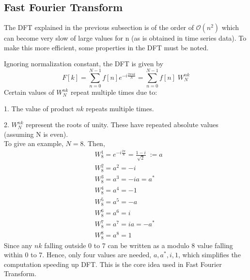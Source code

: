 \documentclass[11pt]{article}
\begin{document}
         \subsection{Fast Fourier Transform}
            The DFT explained in the previous subsection is of the order of $\mathcal{O}(n^2)$ which can become very slow of large values for n (as is obtained in time series data). To make this more efficient, some properties in the DFT must be noted.

            Ignoring normalization constant, the DFT is given by 
            $$
               F[k] = \sum_{n=0}^{N-1} f[n] e^{-i\frac{ 2\pi n k }{N}} = \sum_{n=0}^{N-1} f[n] \; W_N^{nk}
            $$
            Certain values of $W_N^{nk}$ repeat multiple times due to:

            1. The value of product $nk$ repeats multiple times.

            2. $W_N^{nk}$ represent the roots of unity. These have repeated absolute values (assuming N is even). \\[5mm]
            To give an example, $N=8$. Then,
            \begin{align*}
              & W_8^1 = e^{-i\frac{2\pi}{8}} = \frac{1 - i}{\sqrt{2}} \; := a \\
               &W_8^2 = a^2 = -i \\
               &W_8^3 = a^3 = -i a = a^* \\
               &W_8^4 = a^4 = -1 \\
               &W_8^5 = a^5 = -a \\
               &W_8^6 = a^6 = i \\
               &W_8^7 = a^7 = i a = -a^* \\
               &W_8^8 = a^8 = 1
            \end{align*}
            Since any $nk$ falling outside 0 to 7 can be written as a modulo 8 value falling within 0 to 7. Hence, only four values are needed, $a, a^*, i, 1$, which simplifies the computation speeding up DFT. This is the core idea used in Fast Fourier Transform. 
            
\end{document}
